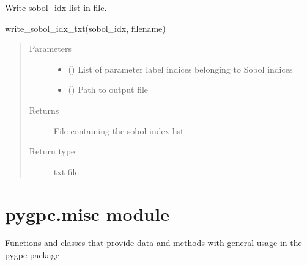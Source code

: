 \documentclass[letterpaper,10pt,english,openany,oneside]{sphinxmanual}
\begin{document}

\begin{fulllineitems}
\label{\detokenize{pygpc:pygpc.io.write_sobol_idx_txt}}
Write sobol\_idx list in file.

write\_sobol\_idx\_txt(sobol\_idx, filename)
\begin{quote}\begin{description}
\item[{Parameters}] \leavevmode\begin{itemize}
\item {} 
 (\sphinxstyleliteralemphasis{\sphinxupquote{{[}}}\sphinxstyleliteralemphasis{\sphinxupquote{{]} }}) \textendash{} List of parameter label indices belonging to Sobol indices

\item {} 
 () \textendash{} Path to output file

\end{itemize}

\item[{Returns}] \leavevmode
{} \textendash{} File containing the sobol index list.

\item[{Return type}] \leavevmode
txt file

\end{description}\end{quote}

\end{fulllineitems}



\section{pygpc.misc module}
\label{\detokenize{pygpc:module-pygpc.misc}}\label{\detokenize{pygpc:pygpc-misc-module}}
Functions and classes that provide data and methods with general usage in the pygpc package
\end{document}
